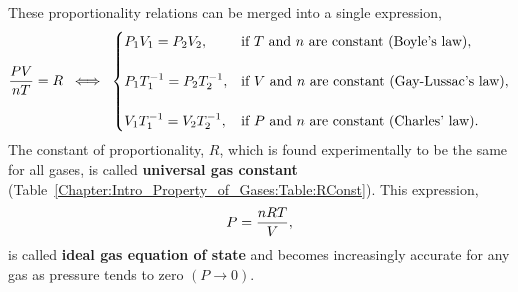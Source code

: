      \begin{shaded}
        These proportionality relations can be merged into a single expression,
          \begin{equation}
            \frc{P V}{n T} = R \;\;\Longleftrightarrow \;\;
              \begin{cases}
                P_{1}V_{1} = P_{2}V_{2}, & \text{if } T \text{ and } n \text{ are constant (Boyle's law)},  \\
         \\
                P_{1}T_{1}^{-1} = P_{2}T_{2}^{-1}, & \text{if } V \text{ and } n \text{ are constant (Gay-Lussac's law)}, \\
         \\
                V_{1}T_{1}^{-1} = V_{2}T_{2}^{-1}, & \text{if } P \text{ and } n \text{ are constant (Charles' law)}.
             \end{cases}\label{Chapter:Intro_Property_of_Gases:Eqn:IdealEOS}\index{Equation of State!Ideal gas}
          \end{equation}
        The constant of proportionality, $R$, which is found experimentally to be the same for all gases, is called {\bf universal gas constant} (Table~\ref{Chapter:Intro_Property_of_Gases:Table:RConst}). This expression, 
          \begin{equation}
             P=\frc{n R T}{V},\label{Chapter:Intro_Property_of_Gases:Eqn:IdealEOS}\index{Equation of State!Ideal gas}
          \end{equation}
        is called {\bf ideal gas equation of state} and becomes increasingly accurate for any gas as pressure tends to zero $\left(P\rightarrow 0\right)$.
     \end{shaded}
     
